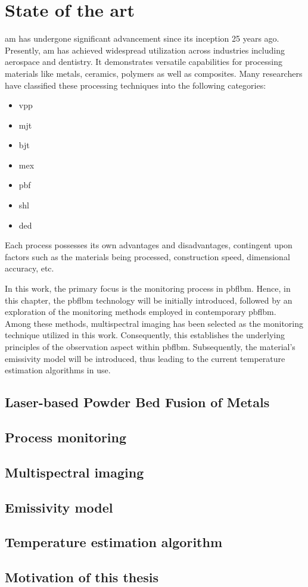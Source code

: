 \chapter{State of the art}%
\gls{am} has undergone significant advancement since its inception 25 years 
ago\cite{J.Scott.2012}. Presently, \gls{am} has achieved widespread 
utilization across industries including aerospace and dentistry. 
It demonstrates versatile capabilities for processing materials 
like metals, ceramics, polymers as well as composites\cite{Frazier.2014}.
Many researchers have classified these processing techniques into the following 
categories\cite{Kruth.1991,Hartke.2011}:

\begin{itemize}
    \item \gls{vpp}
    \item \gls{mjt}
    \item \gls{bjt}
    \item \gls{mex}
    \item \gls{pbf}
    \item \gls{shl}
    \item \gls{ded}
\end{itemize}

Each process possesses its own advantages and disadvantages, 
contingent upon factors such as the materials being processed, 
construction speed, dimensional accuracy, etc\cite{Hartke.2011}.


In this work, the primary focus is the monitoring process in \gls{pbflbm}.
Hence, in this chapter, the \gls{pbflbm} technology will be initially 
introduced, followed by an exploration of the monitoring methods employed 
in contemporary \gls{pbflbm}. Among these methods, multispectral imaging 
has been selected as the monitoring technique utilized in this work. 
Consequently, this establishes the underlying principles of the 
observation aspect within \gls{pbflbm}. Subsequently, the material's 
emissivity model will be introduced, thus leading to the current 
temperature estimation algorithms in use.
%
%
\section{Laser-based Powder Bed Fusion of Metals}


\section{Process monitoring}%

%
%
\section{Multispectral imaging}%

%
%
\section{Emissivity model}%

%
%
\section{Temperature estimation algorithm}


\section{Motivation of this thesis}